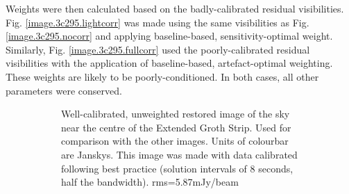 \pg
Weights were then calculated based on the badly-calibrated residual visibilities. Fig. \ref{image.3c295.lightcorr} was made using the same visibilities as Fig. \ref{image.3c295.nocorr} and applying baseline-based, sensitivity-optimal weight. Similarly, Fig. \ref{image.3c295.fullcorr} used the poorly-calibrated residual visibilities with the application of baseline-based, artefact-optimal weighting. These weights are likely to be poorly-conditioned. In both cases, all other parameters were conserved.

\begin{figure}[h!]
\centering
\begin{subfigure}{.49\textwidth}
\caption{\label{image.3c295.goodcal} Well-calibrated, unweighted restored image of the sky near the centre of the Extended Groth Strip. Used for comparison with the other images. {Units of colourbar are Janskys}. This image was made with data calibrated following best practice (solution intervals of 8 seconds, half the bandwidth). rms=5.87mJy/beam}
\end{subfigure}
\hfill
\begin{subfigure}{.49\textwidth}

\end{subfigure}
\end{figure}
